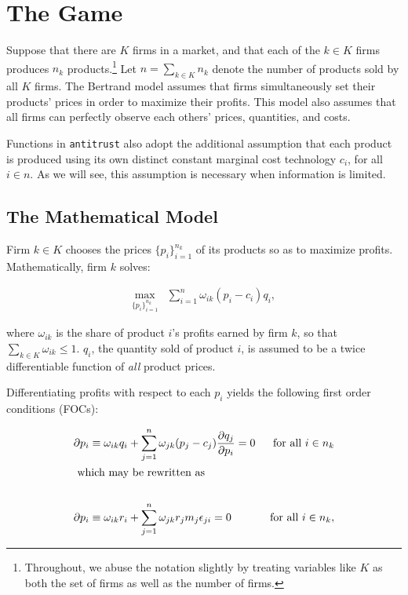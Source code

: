 \documentclass[11pt,numbers=noenddot,pointlessnumbers]{scrreprt}
\newcommand{\atr}{{\tt antitrust}}
\numberwithin{equation}{section}
\begin{document}
\section{The Game}


Suppose that there are $K$ firms in a
market, and that each of the $k \in K$ firms produces $n_k$
products.\footnote{Throughout, we abuse the notation slightly by
  treating variables like $K$ as both the set of firms as well as the
  number of firms.} Let  $n=\sum\limits_{k\in K}n_k$ denote the number of products sold
by all $K$ firms. The Bertrand model assumes that firms
simultaneously set their products' prices in order to maximize
their profits. This model also assumes that all firms can perfectly observe each
others' prices, quantities, and costs.

Functions in \atr{} also adopt the additional assumption that each
product is produced using its own distinct constant marginal cost
technology  $c_i$, for all $i \in n$. As we will see, this
assumption is necessary when information is limited.

\subsection{The Mathematical Model}
Firm $k \in K$ chooses the prices $\{p_i\}_{i=1}^{n_k}$ of its
products so as to maximize profits. Mathematically, firm $k$ solves:

\begin{align*}
\max_{\{p_i\}_{i=1}^{n_k}} &\sum_{i=1}^{n}\omega_{ik}(p_i - c_i)q_i,
\end{align*}

where  $\omega_{ik}$ is the share of product $i$'s profits earned by
firm $k$, so that $\sum\limits_{k\in K} \omega_{ik}\le 1$.  $q_i$, the quantity sold of product $i$,  is assumed to
be a twice differentiable function of \emph{all} product prices.

Differentiating profits with respect to each $p_i$  yields the following first order conditions (FOCs):

\begin{align*}
  \partial p_i&\equiv \omega_{ik}q_i +\sum_{j=1}^{n}\omega_{jk}( p_j - c_j)\frac{\partial q_j}{\partial
    p_i}=0& \mbox{ for all $i\in n_k$} \\
  \intertext{ which may be rewritten as}\\
  \partial p_i&\equiv \omega_{ik}r_i + \sum_{j=1}^{n} \omega_{jk}r_jm_j\epsilon_{ji}=0& \mbox{ for all $i\in n_k$},
\end{align*}
\end{document}
